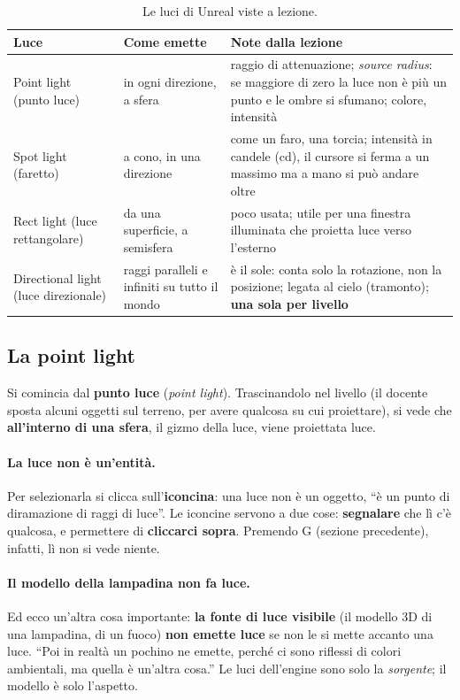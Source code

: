 \begin{table}[htbp]
\centering
\small
\begin{tabular}{@{}p{2.6cm}p{4.2cm}p{5.6cm}@{}}
\toprule
\textbf{Luce} & \textbf{Come emette} & \textbf{Note dalla lezione} \\
\midrule
Point light (punto luce) & in ogni direzione, a sfera &
  raggio di attenuazione; \emph{source radius}: se maggiore di zero la luce non
  è più un punto e le ombre si sfumano; colore, intensità \\
\addlinespace
Spot light (faretto) & a cono, in una direzione &
  come un faro, una torcia; intensità in candele (cd), il cursore si ferma a
  un massimo ma a mano si può andare oltre \\
\addlinespace
Rect light (luce rettangolare) & da una superficie, a semisfera &
  poco usata; utile per una finestra illuminata che proietta luce verso
  l'esterno \\
\addlinespace
Directional light (luce direzionale) & raggi paralleli e infiniti su tutto il mondo &
  è il sole: conta solo la rotazione, non la posizione; legata al cielo
  (tramonto); \textbf{una sola per livello} \\
\bottomrule
\end{tabular}
\caption{Le luci di Unreal viste a lezione.}
\label{gd11:tab:luci}
\end{table}

\subsection{La point light}

Si comincia dal \textbf{punto luce} (\emph{point light}). Trascinandolo nel
livello (il docente sposta alcuni oggetti sul terreno, per avere qualcosa su cui
proiettare), si vede che \textbf{all'interno di una sfera}, il gizmo della luce,
viene proiettata luce.

\paragraph{La luce non è un'entità.} Per selezionarla si clicca
sull'\textbf{iconcina}: una luce non è un oggetto, ``è un punto di diramazione di
raggi di luce''. Le iconcine servono a due cose: \textbf{segnalare} che lì c'è
qualcosa, e permettere di \textbf{cliccarci sopra}. Premendo G (sezione
precedente), infatti, lì non si vede niente.

\paragraph{Il modello della lampadina non fa luce.} Ed ecco un'altra cosa
importante: \textbf{la fonte di luce visibile} (il modello 3D di una lampadina,
di un fuoco) \textbf{non emette luce} se non le si mette accanto una luce.
``Poi in realtà un pochino ne emette, perché ci sono riflessi di colori
ambientali, ma quella è un'altra cosa.'' Le luci dell'engine sono solo la
\emph{sorgente}; il modello è solo l'aspetto.

